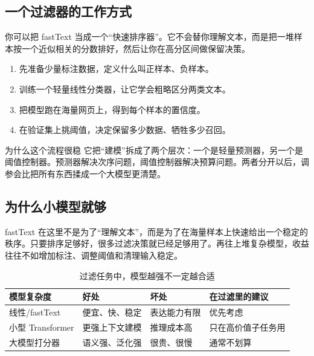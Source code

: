 \subsection{一个过滤器的工作方式}

你可以把 fastText 当成一个“快速排序器”。它不会替你理解文本，而是把一堆样本按一个近似相关的分数排好，然后让你在高分区间做保留决策。

\begin{enumerate}
    \item 先准备少量标注数据，定义什么叫正样本、负样本。
    \item 训练一个轻量线性分类器，让它学会粗略区分两类文本。
    \item 把模型跑在海量网页上，得到每个样本的置信度。
    \item 在验证集上挑阈值，决定保留多少数据、牺牲多少召回。
\end{enumerate}

\begin{importantbox}{为什么这个流程很稳}
它把“建模”拆成了两个层次：一个是轻量预测器，另一个是阈值控制器。预测器解决次序问题，阈值控制器解决预算问题。两者分开以后，调参会比把所有东西揉成一个大模型更清楚。
\end{importantbox}

\subsection{为什么小模型就够}

fastText 在这里不是为了“理解文本”，而是为了在海量样本上快速给出一个稳定的秩序。只要排序足够好，很多过滤决策就已经足够用了。再往上堆复杂模型，收益往往不如增加标注、调整阈值和清理输入稳定。

\begin{table}[H]
\centering
\small
\renewcommand{\arraystretch}{1.15}
\begin{tabular}{p{2.5cm}p{4.2cm}p{4.0cm}p{3.0cm}}
\toprule
\textbf{模型复杂度} & \textbf{好处} & \textbf{坏处} & \textbf{在过滤里的建议} \\
\midrule
线性/fastText & 便宜、快、稳定 & 表达能力有限 & 优先考虑 \\
小型 Transformer & 更强上下文建模 & 推理成本高 & 只在高价值子任务用 \\
大模型打分器 & 语义强、泛化强 & 很贵、很慢 & 通常不划算 \\
\bottomrule
\end{tabular}
\caption{过滤任务中，模型越强不一定越合适}
\end{table}

